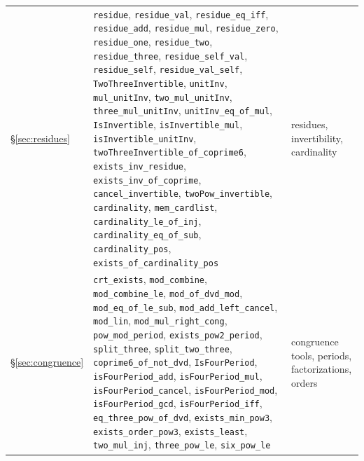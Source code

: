 \documentclass[11pt,reqno,oneside]{amsart}
\theoremstyle{plain}
\theoremstyle{definition}
\numberwithin{equation}{section}
\newcommand{\lean}[1]{\texttt{#1}}
\begin{document}
{\begin{longtable}{@{}>{\raggedright\arraybackslash}p{}>{\raggedright\arraybackslash}p{}>{\raggedright\arraybackslash}p{}@{}}
\S\ref{sec:residues} & \lean{residue}, \lean{residue\_\allowbreak{}val}, \lean{residue\_\allowbreak{}eq\_\allowbreak{}iff}, \lean{residue\_\allowbreak{}add}, \lean{residue\_\allowbreak{}mul}, \lean{residue\_\allowbreak{}zero}, \lean{residue\_\allowbreak{}one}, \lean{residue\_\allowbreak{}two}, \lean{residue\_\allowbreak{}three}, \lean{residue\_\allowbreak{}self\_\allowbreak{}val}, \lean{residue\_\allowbreak{}self}, \lean{residue\_\allowbreak{}val\_\allowbreak{}self}, \lean{TwoThreeInvertible}, \lean{unitInv}, \lean{mul\_\allowbreak{}unitInv}, \lean{two\_\allowbreak{}mul\_\allowbreak{}unitInv}, \lean{three\_\allowbreak{}mul\_\allowbreak{}unitInv}, \lean{unitInv\_\allowbreak{}eq\_\allowbreak{}of\_\allowbreak{}mul}, \lean{IsInvertible}, \lean{isInvertible\_\allowbreak{}mul}, \lean{isInvertible\_\allowbreak{}unitInv}, \lean{twoThreeInvertible\_\allowbreak{}of\_\allowbreak{}coprime6}, \lean{exists\_\allowbreak{}inv\_\allowbreak{}residue}, \lean{exists\_\allowbreak{}inv\_\allowbreak{}of\_\allowbreak{}coprime}, \lean{cancel\_\allowbreak{}invertible}, \lean{twoPow\_\allowbreak{}invertible}, \lean{cardinality}, \lean{mem\_\allowbreak{}cardlist}, \lean{cardinality\_\allowbreak{}le\_\allowbreak{}of\_\allowbreak{}inj}, \lean{cardinality\_\allowbreak{}eq\_\allowbreak{}of\_\allowbreak{}sub}, \lean{cardinality\_\allowbreak{}pos}, \lean{exists\_\allowbreak{}of\_\allowbreak{}cardinality\_\allowbreak{}pos} & residues, invertibility, cardinality \\
\S\ref{sec:congruence} & \lean{crt\_\allowbreak{}exists}, \lean{mod\_\allowbreak{}combine}, \lean{mod\_\allowbreak{}combine\_\allowbreak{}le}, \lean{mod\_\allowbreak{}of\_\allowbreak{}dvd\_\allowbreak{}mod}, \lean{mod\_\allowbreak{}eq\_\allowbreak{}of\_\allowbreak{}le\_\allowbreak{}sub}, \lean{mod\_\allowbreak{}add\_\allowbreak{}left\_\allowbreak{}cancel}, \lean{mod\_\allowbreak{}lin}, \lean{mod\_\allowbreak{}mul\_\allowbreak{}right\_\allowbreak{}cong}, \lean{pow\_\allowbreak{}mod\_\allowbreak{}period}, \lean{exists\_\allowbreak{}pow2\_\allowbreak{}period}, \lean{split\_\allowbreak{}three}, \lean{split\_\allowbreak{}two\_\allowbreak{}three}, \lean{coprime6\_\allowbreak{}of\_\allowbreak{}not\_\allowbreak{}dvd}, \lean{IsFourPeriod}, \lean{isFourPeriod\_\allowbreak{}add}, \lean{isFourPeriod\_\allowbreak{}mul}, \lean{isFourPeriod\_\allowbreak{}cancel}, \lean{isFourPeriod\_\allowbreak{}mod}, \lean{isFourPeriod\_\allowbreak{}gcd}, \lean{isFourPeriod\_\allowbreak{}iff}, \lean{eq\_\allowbreak{}three\_\allowbreak{}pow\_\allowbreak{}of\_\allowbreak{}dvd}, \lean{exists\_\allowbreak{}min\_\allowbreak{}pow3}, \lean{exists\_\allowbreak{}order\_\allowbreak{}pow3}, \lean{exists\_\allowbreak{}least}, \lean{two\_\allowbreak{}mul\_\allowbreak{}inj}, \lean{three\_\allowbreak{}pow\_\allowbreak{}le}, \lean{six\_\allowbreak{}pow\_\allowbreak{}le} & congruence tools, periods, factorizations, orders \\

\end{longtable}}
\end{document}
